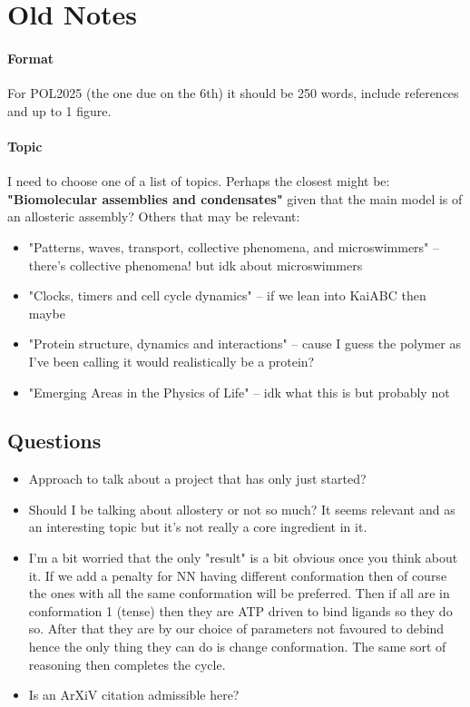 \documentclass[11pt]{article}
\begin{document}
\newpage
\section{Old Notes}
\paragraph{Format}
For POL2025 (the one due on the 6th) it should be 250 words, include references and up to 1 figure.
\paragraph{Topic}
I need to choose one of a list of topics.
Perhaps the closest might be: \textbf{"Biomolecular assemblies and condensates"} given that the main model is of an allosteric assembly?
Others that may be relevant:
\begin{itemize}
	\item "Patterns, waves, transport, collective phenomena, and microswimmers" -- there's collective phenomena! but idk about microswimmers
	\item "Clocks, timers and cell cycle dynamics" -- if we lean into KaiABC then maybe
	\item "Protein structure, dynamics and interactions" -- cause I guess the polymer as I've been calling it would realistically be a protein?
	\item "Emerging Areas in the Physics of Life" -- idk what this is but probably not
\end{itemize}

\subsection{Questions}
\begin{itemize}
	\item Approach to talk about a project that has only just started?
	\item Should I be talking about allostery or not so much? It seems relevant and as an interesting topic but it's not really a core ingredient in it.
	\item I'm a bit worried that the only "result" is a bit obvious once you think about it. If we add a penalty for NN having different conformation then of course the ones with all the same conformation will be preferred. Then if all are in conformation 1 (tense) then they are ATP driven to bind ligands so they do so. After that they are by our choice of parameters not favoured to debind hence the only thing they can do is change conformation. The same sort of reasoning then completes the cycle.
	\item Is an ArXiV citation admissible here?\cite{soneHermitianNonHermitianTopology2024}
\end{itemize}
\end{document}

